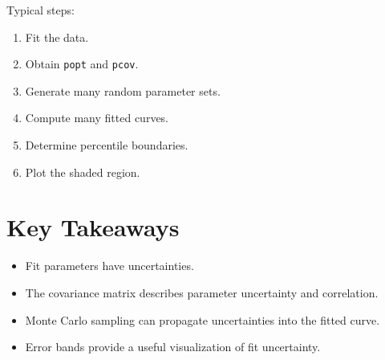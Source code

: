 \documentclass[11pt]{article}
\begin{document}
Typical steps:

\begin{enumerate}
    \item Fit the data.
    \item Obtain \texttt{popt} and \texttt{pcov}.
    \item Generate many random parameter sets.
    \item Compute many fitted curves.
    \item Determine percentile boundaries.
    \item Plot the shaded region.
\end{enumerate}

\section{Key Takeaways}

\begin{itemize}
    \item Fit parameters have uncertainties.
    \item The covariance matrix describes parameter uncertainty and correlation.
    \item Monte Carlo sampling can propagate uncertainties into the fitted curve.
    \item Error bands provide a useful visualization of fit uncertainty.
\end{itemize}
\end{document}
